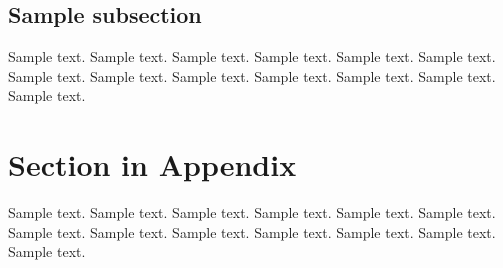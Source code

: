 


\subsection{Sample subsection}
\label{subsec1}

Sample text. Sample text. Sample text. Sample text. Sample text. Sample text. 
Sample text. Sample text. Sample text. Sample text. Sample text. Sample text. 
Sample text. 

\appendix

\section{Section in Appendix}
\label{appendix-sec1}

Sample text. Sample text. Sample text. Sample text. Sample text. Sample text. 
Sample text. Sample text. Sample text. Sample text. Sample text. Sample text. 
Sample text. 
